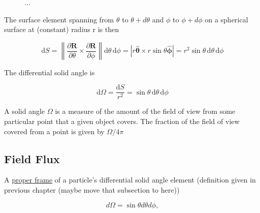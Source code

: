 \begin{figure}[h]
	\caption{...}
\end{figure}

The surface element spanning from $\theta$ to $\theta + d\theta$ and $\phi$ to $\phi + d\phi$ on a spherical surface at (constant) radius r is then

\begin{equation}
	\mathrm{d}S =
	\left\|\frac{\partial {\mathbf R}}{\partial \theta} \times \frac{\partial {\mathbf R}}{\partial \phi}\right\| \mathrm{d}\theta \,\mathrm{d}\phi = \left| r \mathbf{\mathbf{\hat{\text{$\theta$}}}} \times r \sin \theta \mathbf{\mathbf{\hat{\text{$\phi$}}}} \right|= r^2 \sin\theta \,\mathrm{d}\theta \,\mathrm{d}\phi
\end{equation}

The differential solid angle is

\begin{equation}
	\mathrm{d}\Omega = \frac{\mathrm{d}S}{r^2} = \sin\theta \,\mathrm{d}\theta \,\mathrm{d}\phi
\end{equation}%

A solid angle $\Omega$ is a measure of the amount of the field of view from some particular point that a given object covers.
The fraction of the field of view covered from a point is given by $\Omega/ 4\pi$

\subsection{Field Flux}

A \hyperlink{def-proper-frame}{proper frame} of a particle's differential solid angle element  (definition given in previous chapter (maybe move that subsection to here))

\begin{equation}
	d\Omega = \sin{\theta} d\theta d\phi,
\end{equation}

